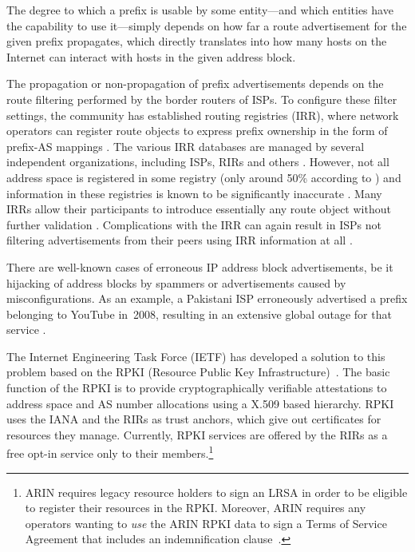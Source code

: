 \documentclass[letter]{sigcomm-alternate}
\begin{document}
The degree to which a prefix is usable by some entity---and which entities have
the capability to use it---simply depends on how far a route advertisement for
the given prefix propagates, which directly translates into how many hosts on
the Internet can interact with hosts in the given address block.

The propagation or non-propagation of prefix advertisements depends on the
route filtering performed by the border routers of ISPs.
To configure these filter settings, the community has established routing
registries (IRR), where network operators can register route objects to express
prefix ownership in the form of prefix-AS mappings \cite{butler2010survey}.
The various IRR databases are managed by several independent organizations,
including ISPs, RIRs and others \cite{irr_list}. However, not all address space
is registered in some registry (only around 50\% according to
\cite{irr50percent}) and information in these registries is known to  be
significantly inaccurate \cite{khan2013}. Many IRRs allow their participants to
introduce essentially any route object without further validation
\cite{bgpmon_rpki}. Complications with the IRR can again result in ISPs not
filtering advertisements from their peers using IRR information at all
\cite{deng2010evaluating}. 

There are well-known cases of erroneous IP address block advertisements, be it
hijacking of address blocks by spammers \cite{spam2006} or advertisements
caused by misconfigurations. As an example, a Pakistani ISP erroneously
advertised a prefix belonging to YouTube in~2008, resulting in an extensive
global outage for that service \cite{youtubehijack}.

The Internet Engineering Task Force (IETF) has developed a solution to this 
problem based on the RPKI (Resource Public Key Infrastructure)~\cite{rfc6480}. 
The basic function of the RPKI is to provide cryptographically verifiable 
attestations to address space and AS number allocations using a X.509 based 
hierarchy. RPKI uses the IANA and the RIRs as trust anchors, which give out 
certificates for resources they manage. Currently, RPKI services are offered by 
the RIRs as a free opt-in service only to their members.\footnote{ARIN requires 
legacy resource holders to sign an LRSA in order to be eligible to register 
their resources in the RPKI. Moreover, ARIN requires any operators wanting to 
\emph{use} the ARIN RPKI data to sign a Terms of Service Agreement that includes
an indemnification clause~\cite{arin_rpki_indemnity}. }
\end{document}
